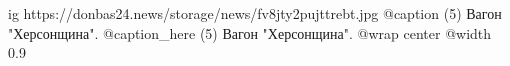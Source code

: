  
 
 
 
 

\ifcmt
  ig https://donbas24.news/storage/news/fv8jty2pujttrebt.jpg
	@caption (5) Вагон "Херсонщина". 
	@caption_here (5) Вагон "Херсонщина". 
  @wrap center
  @width 0.9
\fi
